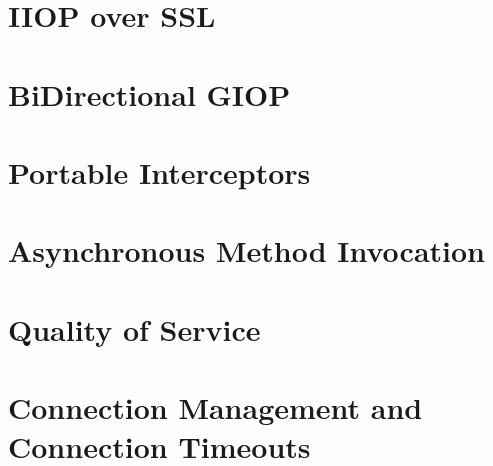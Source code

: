 \documentclass[12pt]{scrbook}
\begin{document}



\chapter{IIOP over SSL}
\label{ch:SSL}




\chapter{BiDirectional GIOP}
\label{ch:bidir}




\chapter{Portable Interceptors}
\label{ch:pi}




\chapter{Asynchronous Method Invocation}
\label{ch:AMI}




\chapter{Quality of Service}
\label{ch:qos}




\chapter{Connection Management and Connection Timeouts}
\label{ch:connections}
\end{document}
